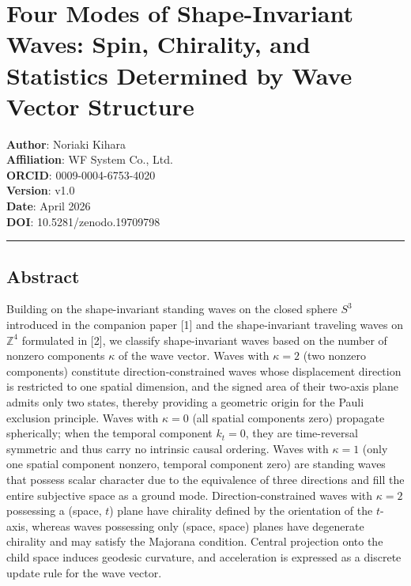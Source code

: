 \documentclass[
  a4paper,11pt]{article}
\theoremstyle{definition}
\theoremstyle{remark}
\begin{document}
\section{Four Modes of Shape-Invariant Waves: Spin, Chirality, and
Statistics Determined by Wave Vector
Structure}\label{four-modes-of-shape-invariant-waves-spin-chirality-and-statistics-determined-by-wave-vector-structure}

\textbf{Author}: Noriaki Kihara\\
\textbf{Affiliation}: WF System Co., Ltd.\\
\textbf{ORCID}: 0009-0004-6753-4020\\
\textbf{Version}: v1.0\\
\textbf{Date}: April 2026\\
\textbf{DOI}: 10.5281/zenodo.19709798

\begin{center}\rule{0.5\linewidth}{0.5pt}\end{center}

\subsection{Abstract}\label{abstract}

Building on the shape-invariant standing waves on the closed sphere
\(S^3\) introduced in the companion paper {[}1{]} and the
shape-invariant traveling waves on \(\mathbb{Z}^4\) formulated in
{[}2{]}, we classify shape-invariant waves based on the number of
nonzero components \(\kappa\) of the wave vector. Waves with
\(\kappa = 2\) (two nonzero components) constitute direction-constrained
waves whose displacement direction is restricted to one spatial
dimension, and the signed area of their two-axis plane admits only two
states, thereby providing a geometric origin for the Pauli exclusion
principle. Waves with \(\kappa = 0\) (all spatial components zero)
propagate spherically; when the temporal component \(k_t = 0\), they are
time-reversal symmetric and thus carry no intrinsic causal ordering.
Waves with \(\kappa = 1\) (only one spatial component nonzero, temporal
component zero) are standing waves that possess scalar character due to
the equivalence of three directions and fill the entire subjective space
as a ground mode. Direction-constrained waves with \(\kappa = 2\)
possessing a (space, \(t\)) plane have chirality defined by the
orientation of the \(t\)-axis, whereas waves possessing only (space,
space) planes have degenerate chirality and may satisfy the Majorana
condition. Central projection onto the child space induces geodesic
curvature, and acceleration is expressed as a discrete update rule for
the wave vector.
\end{document}
